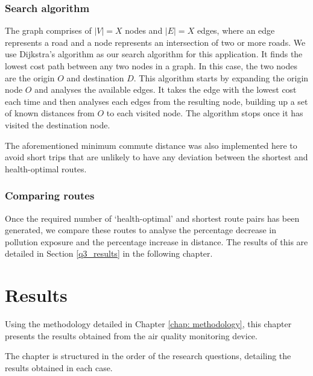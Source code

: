 \documentclass[11pt]{report}
\begin{document}
\subsection{Search algorithm}

The graph comprises of $|V| = X$ nodes and $|E| = X$ edges, where an edge represents a road and a node represents an intersection of two or more roads. We use Dijkstra's algorithm \citep{dijkstra1959} as our search algorithm for this application. It finds the lowest cost path between any two nodes in a graph. In this case, the two nodes are the origin $O$ and destination $D$. This algorithm starts by expanding the origin node $O$ and analyses the available edges. It takes the edge with the lowest cost each time and then analyses each edges from the resulting node, building up a set of known distances from $O$ to each visited node. The algorithm stops once it has visited the destination node.

The aforementioned minimum commute distance was also implemented here to avoid short trips that are unlikely to have any deviation between the shortest and health-optimal routes.


\subsection{Comparing routes}

Once the required number of `health-optimal' and shortest route pairs has been generated, we compare these routes to analyse the percentage decrease in pollution exposure and the percentage increase in distance. The results of this are detailed in Section \ref{q3_results} in the following chapter.




\chapter{Results} \label{chap: results}

Using the methodology detailed in Chapter \ref{chap: methodology}, this chapter presents the results obtained from the air quality monitoring device.

The chapter is structured in the order of the research questions, detailing the results obtained in each case.
\end{document}
